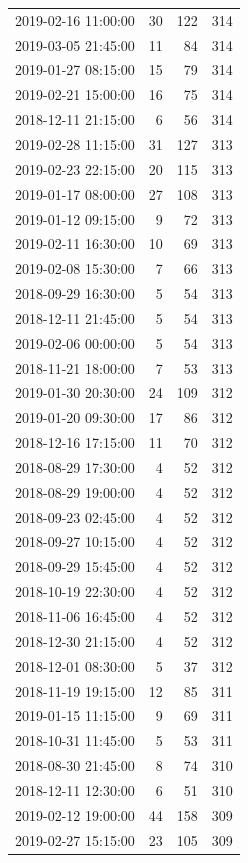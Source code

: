 \begin{tabular}{lrrr}
2019-02-16 11:00:00 & 30 & 122 & 314 \\
2019-03-05 21:45:00 & 11 & 84 & 314 \\
2019-01-27 08:15:00 & 15 & 79 & 314 \\
2019-02-21 15:00:00 & 16 & 75 & 314 \\
2018-12-11 21:15:00 & 6 & 56 & 314 \\
2019-02-28 11:15:00 & 31 & 127 & 313 \\
2019-02-23 22:15:00 & 20 & 115 & 313 \\
2019-01-17 08:00:00 & 27 & 108 & 313 \\
2019-01-12 09:15:00 & 9 & 72 & 313 \\
2019-02-11 16:30:00 & 10 & 69 & 313 \\
2019-02-08 15:30:00 & 7 & 66 & 313 \\
2018-09-29 16:30:00 & 5 & 54 & 313 \\
2018-12-11 21:45:00 & 5 & 54 & 313 \\
2019-02-06 00:00:00 & 5 & 54 & 313 \\
2018-11-21 18:00:00 & 7 & 53 & 313 \\
2019-01-30 20:30:00 & 24 & 109 & 312 \\
2019-01-20 09:30:00 & 17 & 86 & 312 \\
2018-12-16 17:15:00 & 11 & 70 & 312 \\
2018-08-29 17:30:00 & 4 & 52 & 312 \\
2018-08-29 19:00:00 & 4 & 52 & 312 \\
2018-09-23 02:45:00 & 4 & 52 & 312 \\
2018-09-27 10:15:00 & 4 & 52 & 312 \\
2018-09-29 15:45:00 & 4 & 52 & 312 \\
2018-10-19 22:30:00 & 4 & 52 & 312 \\
2018-11-06 16:45:00 & 4 & 52 & 312 \\
2018-12-30 21:15:00 & 4 & 52 & 312 \\
2018-12-01 08:30:00 & 5 & 37 & 312 \\
2018-11-19 19:15:00 & 12 & 85 & 311 \\
2019-01-15 11:15:00 & 9 & 69 & 311 \\
2018-10-31 11:45:00 & 5 & 53 & 311 \\
2018-08-30 21:45:00 & 8 & 74 & 310 \\
2018-12-11 12:30:00 & 6 & 51 & 310 \\
2019-02-12 19:00:00 & 44 & 158 & 309 \\
2019-02-27 15:15:00 & 23 & 105 & 309 \\

\end{tabular}

